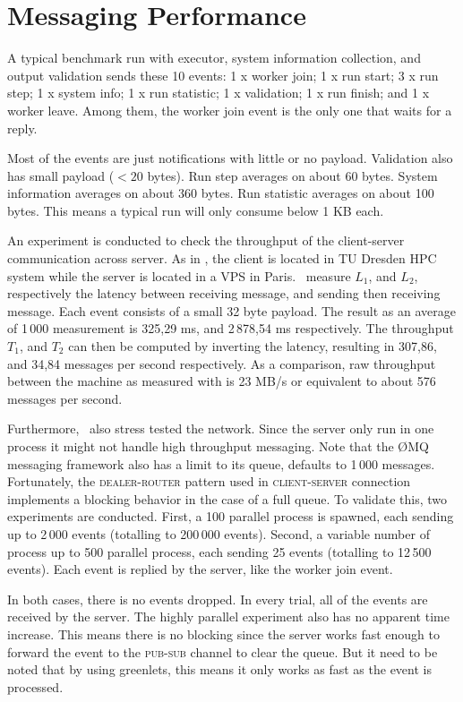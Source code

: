 \section{Messaging Performance}
\label{sec:eval.messaging}

A typical benchmark run with executor, system information collection, and output validation sends these 10 events:
1 x worker join;
1 x run start;
3 x run step;
1 x system info;
1 x run statistic;
1 x validation;
1 x run finish; and
1 x worker leave.
Among them, the worker join event is the only one that waits for a reply.

Most of the events are just notifications with little or no payload.
Validation also has small payload ($< 20$ bytes).
Run step averages on about 60 bytes.
System information averages on about 360 bytes.
Run statistic averages on about 100 bytes.
This means a typical run will only consume below 1 KB each.

An experiment is conducted to check the throughput of the client-server communication across server.
As in , the client is located in TU Dresden HPC system while the server is located in a VPS in Paris.
\First~measure \(L_1\), and \(L_2\), respectively the latency between receiving message, and sending then receiving message.
Each event consists of a small 32 byte payload.
The result as an average of 1\,000 measurement is 325,29 ms, and 2\,878,54 ms respectively.
The throughput \(T_1\), and \(T_2\) can then be computed by inverting the latency, resulting in 307,86, and 34,84 messages per second respectively.
As a comparison, raw throughput between the machine as measured with  is 23 MB/s or equivalent to about 576 messages per second.

Furthermore, \first~also stress tested the network.
Since the server only run in one process it might not handle high throughput messaging.
Note that the \O MQ messaging framework also has a limit to its queue, defaults to 1\,000 messages.
Fortunately, the \textsc{dealer-router} pattern used in \textsc{client-server} connection implements a blocking behavior in the case of a full queue.
To validate this, two experiments are conducted.
First, a 100 parallel process is spawned, each sending up to 2\,000 events (totalling to 200\,000 events).
Second, a variable number of process up to 500 parallel process, each sending 25 events (totalling to 12\,500 events).
Each event is replied by the server, like the worker join event.

In both cases, there is no events dropped.
In every trial, all of the events are received by the server.
The highly parallel experiment also has no apparent time increase.
This means there is no blocking since the server works fast enough to forward the event to the \textsc{pub}-\textsc{sub} channel to clear the queue.
But it need to be noted that by using greenlets, this means it only works as fast as the event is processed.


